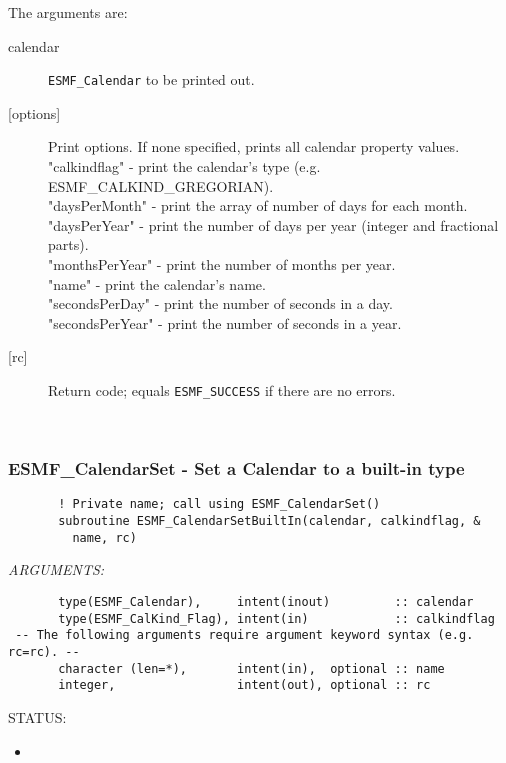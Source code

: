        The arguments are:
       \begin{description}
       \item[calendar]
            {\tt ESMF\_Calendar} to be printed out.
       \item[{[options]}]
            Print options. If none specified, prints all calendar property
                               values. \\
            "calkindflag"    - print the calendar's type 
                                 (e.g. ESMF\_CALKIND\_GREGORIAN). \\
            "daysPerMonth"   - print the array of number of days for
                                 each month. \\
            "daysPerYear"    - print the number of days per year
                               (integer and fractional parts). \\
            "monthsPerYear"  - print the number of months per year. \\
            "name"           - print the calendar's name. \\
            "secondsPerDay"  - print the number of seconds in a day. \\
            "secondsPerYear" - print the number of seconds in a year. \\
       \item[{[rc]}]
            Return code; equals {\tt ESMF\_SUCCESS} if there are no errors.
       \end{description}
   
 
\mbox{}\hrulefill\ 
 
\subsubsection [ESMF\_CalendarSet] {ESMF\_CalendarSet - Set a Calendar to a built-in type}


 
\begin{verbatim}       ! Private name; call using ESMF_CalendarSet()
       subroutine ESMF_CalendarSetBuiltIn(calendar, calkindflag, &
         name, rc)
 \end{verbatim}{\em ARGUMENTS:}
\begin{verbatim}       type(ESMF_Calendar),     intent(inout)         :: calendar
       type(ESMF_CalKind_Flag), intent(in)            :: calkindflag
 -- The following arguments require argument keyword syntax (e.g. rc=rc). --
       character (len=*),       intent(in),  optional :: name
       integer,                 intent(out), optional :: rc
 \end{verbatim}
{\sf STATUS:}
   \begin{itemize}
   \item{}
   \end{itemize}
  
